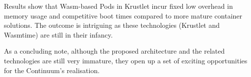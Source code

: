 


Results show that Wasm-based Pods in Krustlet incur fixed low overhead in memory usage and competitive boot times compared to more mature container solutions. The outcome is intriguing as these technologies (Krustlet and Wasmtime) are still in their infancy.

As a concluding note, although the proposed architecture and the related technologies are still very immature, they open up a set of exciting opportunities for the Continuum's realisation.

